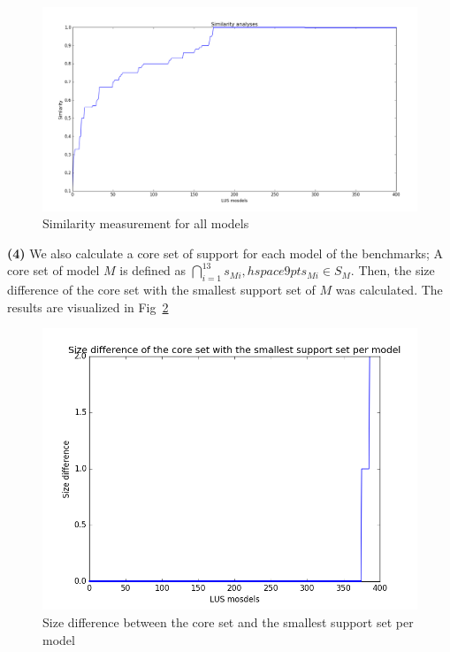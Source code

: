 \begin{figure}
  \centering
  \includegraphics[width=\textwidth]{figs/similarity.png}
  \caption{Similarity measurement for all models}\label{fig:sim}
\end{figure}


\noindent{}
 \vspace{9pt}

\textbf{(4)}
We also calculate a core set of support for each model of the benchmarks; A core set of model $M$ is defined as
$\bigcap_{i=1}^{13} s_{Mi},   hspace{9pt} s_{Mi} \in S_M$. Then, the size difference of the core set with the smallest support set of $M$ was calculated. The results are visualized in Fig~\ref{fig:core}

\begin{figure}
  \centering
  \includegraphics[width=\textwidth]{figs/core.png}
  \caption{Size difference between the core set and the smallest support set per model}\label{fig:core}
\end{figure}


